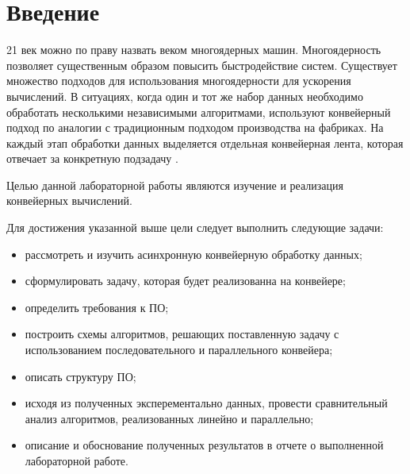 \chapter*{Введение}

21 век можно по праву назвать веком многоядерных машин. Многоядерность позволяет существенным образом повысить быстродействие систем. Существует множество подходов для использования многоядерности для ускорения вычислений. В ситуациях, когда один и тот же набор данных необходимо обработать несколькими независимыми алгоритмами, используют конвейерный подход по аналогии с традиционным подходом производства на фабриках. На каждый этап обработки данных выделяется отдельная конвейерная лента, которая отвечает за конкретную подзадачу \cite{parallel}.

Целью данной лабораторной работы являются изучение и реализация конвейерных вычислений.

Для достижения указанной выше цели следует выполнить следующие задачи:
\begin{itemize}
	\item рассмотреть и изучить асинхронную конвейерную обработку данных;
	\item сформулировать задачу, которая будет реализованна на конвейере;
	\item определить требования к ПО;
	\item построить схемы алгоритмов, решающих поставленную задачу с использованием последовательного и параллельного конвейера;
	\item описать структуру ПО;
	\item исходя из полученных эксперементально данных, провести сравнительный анализ алгоритмов, реализованных линейно и параллельно;
	\item описание и обоснование полученных результатов в отчете о выполненной лабораторной работе.
\end{itemize}

